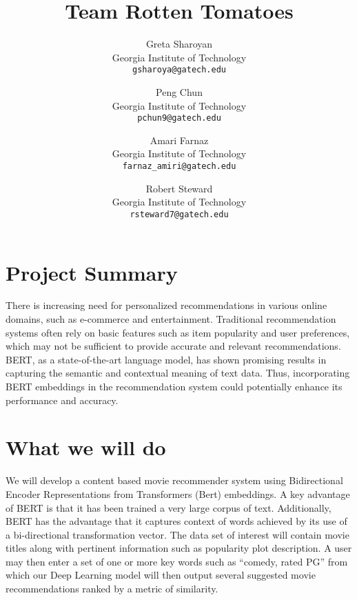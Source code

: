 \documentclass[10pt,twocolumn,letterpaper]{article}
\begin{document}
\title{Team Rotten Tomatoes}

\author{Greta Sharoyan\\
Georgia Institute of Technology\\
{\tt\small gsharoya@gatech.edu}
\and
Peng Chun\\
Georgia Institute of Technology\\
{\tt\small pchun9@gatech.edu}\\
\and
Amari Farnaz\\
Georgia Institute of Technology\\
{\tt\small farnaz\_amiri@gatech.edu}
\and
Robert Steward\\
Georgia Institute of Technology\\
{\tt\small rsteward7@gatech.edu}
}

\maketitle



\section{Project Summary}
There is increasing need for personalized recommendations in various online domains, such as e-commerce and entertainment. Traditional recommendation systems often rely on basic features such as item popularity and user preferences, which may not be sufficient to provide accurate and relevant recommendations. BERT, as a state-of-the-art language model, has shown promising results in capturing the semantic and contextual meaning of text data. Thus, incorporating BERT embeddings in the recommendation system could potentially enhance its performance and accuracy.

\section{What we will do}
We will develop a content based movie recommender system using Bidirectional Encoder Representations from Transformers (Bert) embeddings.    A key advantage of BERT is that it has been trained a very large corpus of text.  Additionally, BERT has the advantage that it captures context of words achieved by its use of a bi-directional transformation vector.  The data set of interest will contain movie titles along with pertinent information such as popularity plot description.  A user may then enter a set of one or more key words such as “comedy, rated PG” from which our Deep Learning model will then output several suggested movie recommendations ranked by a metric of similarity.
\end{document}

